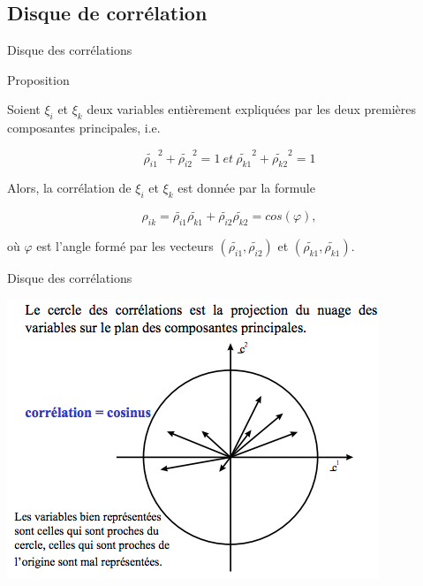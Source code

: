 \documentclass[11pt]{beamer}
\begin{document}
\subsection{Disque de corrélation}
\begin{frame}{Disque des corrélations}

  \begin{block}{Proposition}
  
  
  Soient $\xi_i$ et $\xi_k$ deux variables entièrement expliquées par les deux premières composantes principales, i.e.
  
  $$ \tilde{\rho_{i1}}^2 + \tilde{\rho_{i2}}^2=1 \ et  \  \tilde{\rho_{k1}}^2 + \tilde{\rho_{k2}}^2=1 $$
  
  Alors, la corrélation de $\xi_i$ et $\xi_k$ est donnée par la formule 
  
  $$  {\rho_{ik}}  = \tilde{\rho_{i1}}   \tilde{\rho_{k1}}  +  \tilde{\rho_{i2}}   \tilde{\rho_{k2}}  = cos(\varphi), $$

où $\varphi$ est l'angle formé par les vecteurs $(\tilde{\rho_{i1}}, \tilde{\rho_{i2}})$ et $(\tilde{\rho_{k1}}, \tilde{\rho_{k1}})$.
  
  \end{block}
 

\end{frame}

\begin{frame}{Disque des corrélations}

\centering 

 \includegraphics[scale=0.7]{Correlation.png}


\end{frame}
\end{document}
